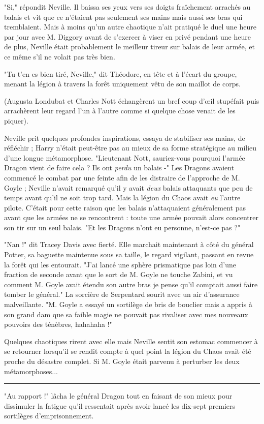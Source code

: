 "Si," répondit Neville. Il baissa ses yeux vers ses doigts fraîchement arrachés au balais et vit que ce n'étaient pas seulement ses mains mais aussi ses bras qui tremblaient. Mais à moins qu'un autre chaotique n'ait pratiqué le duel une heure par jour avec M. Diggory avant de s'exercer à viser en privé pendant une heure de plus, Neville était probablement le meilleur tireur sur balais de leur armée, et ce même s'il ne volait pas très bien.

"Tu t'en es bien tiré, Neville," dit Théodore, en tête et à l'écart du groupe, menant la légion à travers la forêt uniquement vêtu de son maillot de corps.

(Augusta Londubat et Charles Nott échangèrent un bref coup d'œil stupéfait puis arrachèrent leur regard l'un à l'autre comme si quelque chose venait de les piquer).

Neville prit quelques profondes inspirations, essaya de stabiliser ses mains, de réfléchir ; Harry n'était peut-être pas au mieux de sa forme stratégique au milieu d'une longue métamorphose. "Lieutenant Nott, sauriez-vous pourquoi l'armée Dragon vient de faire cela ? Ils ont \emph{perdu}  un balais -" Les Dragons avaient commencé le combat par une feinte afin de les distraire de l'approche de M. Goyle ; Neville n'avait remarqué qu'il y avait \emph{deux}  balais attaquants que peu de temps avant qu'il ne soit trop tard. Mais la légion du Chaos avait \emph{eu}  l'autre pilote. C'était pour cette raison que les balais n'attaquaient généralement pas avant que les armées ne se rencontrent : toute une armée pouvait alors concentrer son tir sur un seul balais. "Et les Dragons n'ont eu personne, n'est-ce pas ?"

"Nan !" dit Tracey Davis avec fierté. Elle marchait maintenant à côté du général Potter, sa baguette maintenue sous sa taille, le regard vigilant, passant en revue la forêt qui les entourait. "J'ai lancé une sphère prismatique pas loin d'une fraction de seconde avant que le sort de M. Goyle ne touche Zabini, et vu comment M. Goyle avait étendu son autre bras je pense qu'il comptait aussi faire tomber le général." La sorcière de Serpentard sourit avec un air d'assurance malveillante. "M. Goyle a essayé un sortilège de bris de bouclier mais a appris à son grand dam que sa faible magie ne pouvait pas rivaliser avec mes nouveaux pouvoirs des ténèbres, hahahaha !"

Quelques chaotiques rirent avec elle mais Neville sentit son estomac commencer à se retourner lorsqu'il se rendit compte à quel point la légion du Chaos avait été proche du désastre complet. Si M. Goyle était parvenu à perturber les deux métamorphoses...
\par\noindent\rule{\textwidth}{0.4pt}
"Au rapport !" lâcha le général Dragon tout en faisant de son mieux pour dissimuler la fatigue qu'il ressentait après avoir lancé les dix-sept premiers sortilèges d'emprisonnement.

